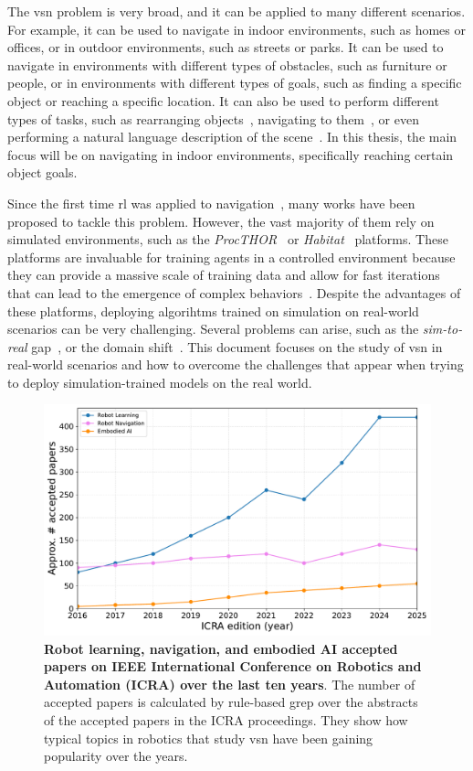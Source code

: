 The \acrshort{vsn} problem is very broad, and it can be applied to many different scenarios.
For example, it can be used to navigate in indoor environments, such as homes or offices, or in outdoor environments, such as streets or parks.
It can be used to navigate in environments with different types of obstacles, such as furniture or people, or in environments with different types of goals, such as finding a specific object or reaching a specific location.
It can also be used to perform different types of tasks, such as rearranging objects~\cite{NEURIPS2021_021bbc7e}, navigating to them~\cite{batra2020}, or even performing a natural language description of the scene~\cite{Tan2021EmbodiedSD}.
In this thesis, the main focus will be on navigating in indoor environments, specifically reaching certain object goals.

Since the first time \acrshort{rl} was applied to navigation~\cite{MAHADEVAN1992311}, many works have been proposed to tackle this problem.
However, the vast majority of them rely on simulated environments, such as the \textit{ProcTHOR}~\cite{Deitke2022ProcTHORLE} or \textit{Habitat}~\cite{NEURIPS2021_021bbc7e} platforms.
These platforms are invaluable for training agents in a controlled environment because they can provide a massive scale of training data and allow for fast iterations that can lead to the emergence of complex behaviors~\cite{Wijmans2022EmergenceOI}.
Despite the advantages of these platforms, deploying algorihtms trained on simulation on real-world scenarios can be very challenging.
Several problems can arise, such as the \textit{sim-to-real} gap~\cite{kadian2020}, or the domain shift~\cite{kim2022}.
This document focuses on the study of \acrshort{vsn} in real-world scenarios and how to overcome the challenges that appear when trying to deploy simulation-trained models on the real world.

\begin{figure}
    \centering
    \includegraphics[width=\textwidth]{figures/introduction/icra_papers}
    \caption{\textbf{Robot learning, navigation, and embodied AI accepted papers on IEEE International Conference on Robotics and Automation (ICRA) over the last ten years}. The number of accepted papers is calculated by rule-based grep over the abstracts of the accepted papers in the ICRA proceedings. They show how typical topics in robotics that study \acrshort{vsn} have been gaining popularity over the years.}
    \label{fig:icra_papers}
\end{figure}

